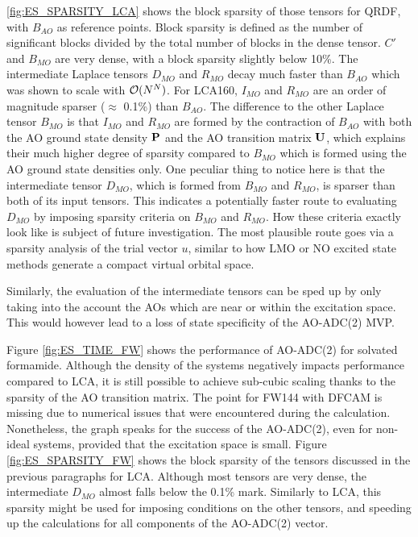 \ref{fig:ES_SPARSITY_LCA} shows the block sparsity of those tensors for QRDF, with $B_{AO}$ as reference points. Block sparsity is defined as the number of significant blocks divided by the total number of blocks in the dense tensor. $C'$ and $B_{MO}$ are very dense, with a block sparsity slightly below 10\%. The intermediate Laplace tensors $D_{MO}$ and $R_{MO}$ decay much faster than $B_{AO}$ which was shown to scale with $\mathcal{O}(N^{N})$. For LCA160, $I_{MO}$ and $R_{MO}$ are an order of magnitude sparser ($\approx$ 0.1\%) than $B_{AO}$. The difference to the other Laplace tensor $B_{MO}$ is that $I_{MO}$ and $R_{MO}$ are formed by the contraction of $B_{AO}$ with both the AO ground state density $\mathbf{P}$ and the AO transition matrix $\mathbf{U}$, which explains their much higher degree of sparsity compared to $B_{MO}$ which is formed using the AO ground state densities only. One peculiar thing to notice here is that the intermediate tensor $D_{MO}$, which is formed from $B_{MO}$ and $R_{MO}$, is sparser than both of its input tensors. This indicates a potentially faster route to evaluating $D_{MO}$ by imposing sparsity criteria on $B_{MO}$ and $R_{MO}$. How these criteria exactly look like is subject of future investigation. The most plausible route goes via a sparsity analysis of the trial vector $u$, similar to how LMO or NO excited state methods generate a compact virtual orbital space.

Similarly, the evaluation of the intermediate tensors can be sped up by only taking into the account the AOs which are near or within the excitation space. This would however lead to a loss of state specificity of the AO-ADC(2) MVP. 

Figure \ref{fig:ES_TIME_FW} shows the performance of AO-ADC(2) for solvated formamide. Although the density of the systems negatively impacts performance compared to LCA, it is still possible to achieve sub-cubic scaling thanks to the sparsity of the AO transition matrix. The point for FW144 with DFCAM is missing due to numerical issues that were encountered during the calculation. Nonetheless, the graph speaks for the success of the AO-ADC(2), even for non-ideal systems, provided that the excitation space is small. Figure \ref{fig:ES_SPARSITY_FW} shows the block sparsity of the tensors discussed in the previous paragraphs for LCA. Although most tensors are very dense, the intermediate $D_{MO}$ almost falls below the 0.1\% mark. Similarly to LCA, this sparsity might be used for imposing conditions on the other tensors, and speeding up the calculations for all components of the AO-ADC(2) vector. 

